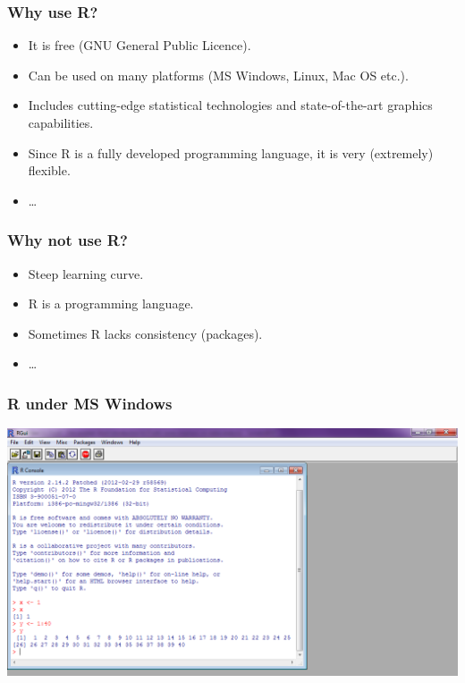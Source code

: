 \documentclass[bigger]{beamer}
\begin{document}
\begin{frame}
\frametitle{Why use R?}
\label{sec-1-1-3}

\begin{itemize}
\item It is free (GNU General Public Licence).
\item Can be used on many platforms (MS Windows, Linux, Mac OS etc.).
\item Includes cutting-edge statistical technologies and state-of-the-art graphics capabilities.
\item Since R is a fully developed programming language, it is very (extremely) flexible.
\item \ldots
\end{itemize}

\end{frame}
\begin{frame}
\frametitle{Why not use R?}
\label{sec-1-1-4}

\begin{itemize}
\item Steep learning curve.
\item R is a programming language.
\item Sometimes R lacks consistency (packages).
\item \ldots
\end{itemize}
\end{frame}
\begin{frame}
\frametitle{R under MS Windows}
\label{sec-1-1-5}

    \begin{center}
    \includegraphics[scale = 0.3]{../graph/f_screenshot}
    \end{center}
\end{frame}
\end{document}
